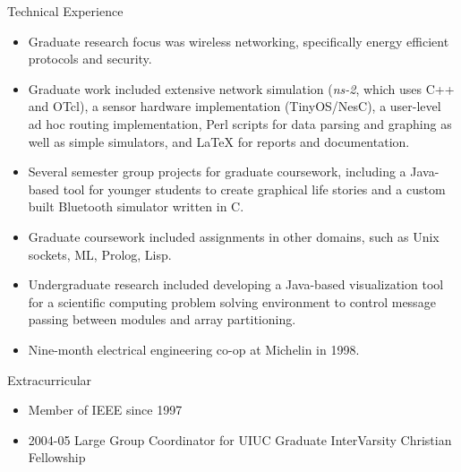 \documentclass[10pt]{article}
\begin{document}
\begin{cv}
\begin{cvlist}{Technical Experience}
\item
\begin{itemize}\itemsep=0.25em
	\item Graduate research focus was wireless networking, specifically
	energy efficient protocols and security.
	\item Graduate work included extensive network simulation
	(\emph{ns-2}, which uses C++ and OTcl), 
	a sensor hardware implementation (TinyOS/NesC),
	a user-level ad hoc routing implementation, Perl scripts for
	data parsing and graphing as well as simple simulators, and LaTeX
	for reports and documentation.
	\item Several semester group projects for graduate coursework,
	including a Java-based tool for younger students to create graphical
	life stories and a custom built Bluetooth simulator written in C.
	\item Graduate coursework included assignments in
	other domains, such as Unix sockets, ML, Prolog, Lisp.
	\item Undergraduate research included developing a Java-based
	visualization tool for a scientific computing problem solving
	environment to control message passing between modules and array
	partitioning.
	\item Nine-month electrical engineering co-op at Michelin in 1998.
\end{itemize}
\end{cvlist}

\begin{cvlist}{Extracurricular}
\item
\begin{itemize}\itemsep=0.25em
	\item Member of IEEE since 1997
	\item 2004-05 Large Group Coordinator for UIUC Graduate
	InterVarsity Christian Fellowship
\end{itemize}
\end{cvlist}

\setlength{\cvlabelwidth}{\oldcvlabelwidth}
\setlength{\cvlabelsep}{\oldcvlabelsep}

\end{cv}
\end{document}

